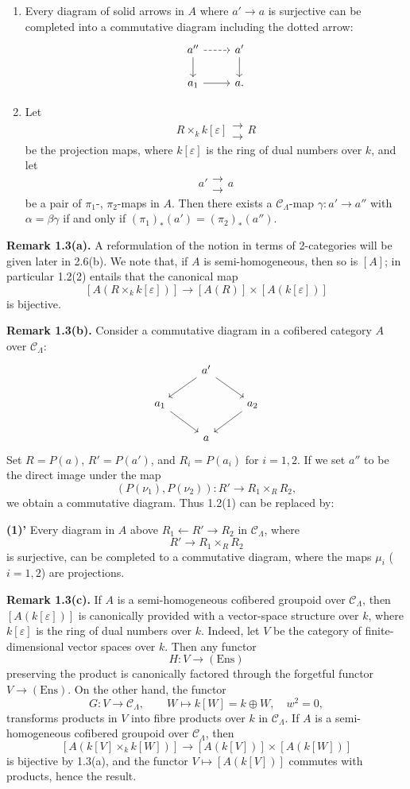 \documentclass[11pt]{article}
\providecommand{\Ens}{\mathrm{Ens}}
\providecommand{\CL}{\mathcal C_\Lambda}
\begin{document}
\begin{enumerate}[label=(\arabic*)]
\item Every diagram of solid arrows in $A$ where $a'\to a$ is surjective can be completed into a commutative diagram including the dotted arrow:
\[
\begin{tikzcd}
 a'' \arrow[r,dashed] \arrow[d] & a' \arrow[d]\\
 a_1 \arrow[r] & a .
\end{tikzcd}
\]

\item Let
\[
 R\times_k k[\varepsilon]\mathrel{\substack{\longrightarrow\\[-.6ex]\longrightarrow}} R
\]
be the projection maps, where $k[\varepsilon]$ is the ring of dual numbers over $k$, and let
\[
 a'\mathrel{\substack{\longrightarrow\\[-.6ex]\longrightarrow}} a
\]
be a pair of $\pi_1$-, $\pi_2$-maps in $A$. Then there exists a $\CL$-map $\gamma:a'\to a''$ with $\alpha=\beta\gamma$ if and only if $(\pi_1)_*(a')=(\pi_2)_*(a'')$.
\end{enumerate}

\textbf{Remark 1.3(a).} A reformulation of the notion in terms of 2-categories will be given later in 2.6(b). We note that, if $A$ is semi-homogeneous, then so is $[A]$; in particular 1.2(2) entails that the canonical map
\[
 [A(R\times_k k[\varepsilon])]\longrightarrow [A(R)]\times [A(k[\varepsilon])]
\]
is bijective.

\textbf{Remark 1.3(b).} Consider a commutative diagram in a cofibered category $A$ over $\CL$:
\[
\begin{tikzcd}
& a' \arrow[dl] \arrow[dr] & \\
a_1 \arrow[dr] && a_2 \arrow[dl]\\
& a &
\end{tikzcd}
\]
Set $R=P(a)$, $R'=P(a')$, and $R_i=P(a_i)$ for $i=1,2$. If we set $a''$ to be the direct image under the map
\[
 (P(\nu_1),P(\nu_2)):R'\longrightarrow R_1\times_R R_2,
\]
we obtain a commutative diagram. Thus 1.2(1) can be replaced by:

\textbf{(1)'} Every diagram in $A$ above $R_1\leftarrow R'\to R_2$ in $\CL$, where
\[
 R'\longrightarrow R_1\times_R R_2
\]
is surjective, can be completed to a commutative diagram, where the maps $\mu_i$ ($i=1,2$) are projections.

\textbf{Remark 1.3(c).} If $A$ is a semi-homogeneous cofibered groupoid over $\CL$, then $[A(k[\varepsilon])]$ is canonically provided with a vector-space structure over $k$, where $k[\varepsilon]$ is the ring of dual numbers over $k$. Indeed, let $V$ be the category of finite-dimensional vector spaces over $k$. Then any functor
\[
 H:V\longrightarrow(\Ens)
\]
preserving the product is canonically factored through the forgetful functor $V\to(\Ens)$. On the other hand, the functor
\[
 G:V\longrightarrow\CL,
 \qquad W\longmapsto k[W]=k\oplus W,
 \quad w^2=0,
\]
transforms products in $V$ into fibre products over $k$ in $\CL$. If $A$ is a semi-homogeneous cofibered groupoid over $\CL$, then
\[
 [A(k[V]\times_k k[W])]\longrightarrow [A(k[V])]\times[A(k[W])]
\]
is bijective by 1.3(a), and the functor $V\mapsto [A(k[V])]$ commutes with products, hence the result.
\end{document}
